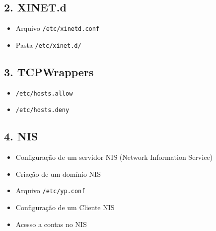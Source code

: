 \documentclass[12pt]{article}
\begin{document}
	\subsection*{2. XINET.d}
	\begin{itemize}
		\item Arquivo \texttt{/etc/xinetd.conf}
		\item Pasta \texttt{/etc/xinet.d/}
	\end{itemize}
	
	\subsection*{3. TCPWrappers}
	\begin{itemize}
		\item \texttt{/etc/hosts.allow}
		\item \texttt{/etc/hosts.deny}
	\end{itemize}
	
	\subsection*{4. NIS}
	\begin{itemize}
		\item Configuração de um servidor NIS (Network Information Service)
		\item Criação de um domínio NIS
		\item Arquivo \texttt{/etc/yp.conf}
		\item Configuração de um Cliente NIS
		\item Acesso a contas no NIS
	\end{itemize}
	
\end{document}
